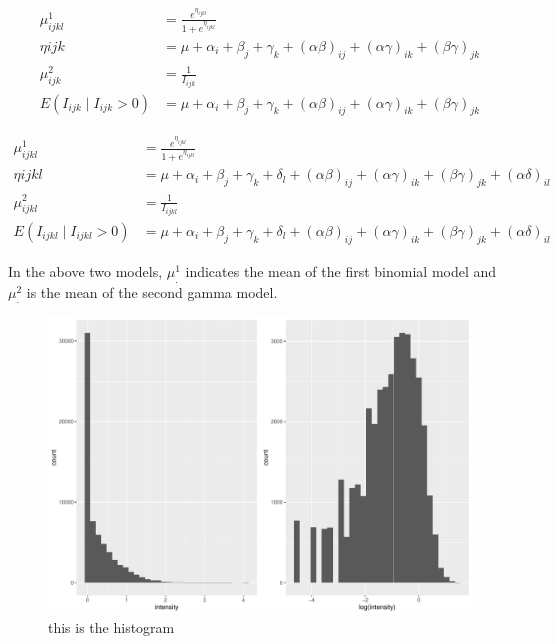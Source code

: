 \documentclass{monashthesis}
\begin{document}
\begin{align}\label{eq:two-part1}
\mu_{ijkl}^1 &= \frac{e^{\eta_{ijkl}}}{1 + e^{\eta_{ijkl}}} \\
\eta{ijk} &= \mu + \alpha_i + \beta_j +\gamma_k + (\alpha\beta)_{ij} + (\alpha\gamma)_{ik} + (\beta\gamma)_{jk} \\
\mu_{ijk}^2 &= \frac{1}{I_{ijk}} \\
E(I_{ijk} \mid I_{ijk} > 0) &= \mu + \alpha_i + \beta_j +\gamma_k + (\alpha\beta)_{ij} + (\alpha\gamma)_{ik} + (\beta\gamma)_{jk}
\end{align}

\begin{align}\label{eq:two-part2}
\mu_{ijkl}^1 &= \frac{e^{\eta_{ijkl}}}{1 + e^{\eta_{ijkl}}} \\
\eta{ijkl} &= \mu + \alpha_i + \beta_j +\gamma_k + \delta_l + (\alpha\beta)_{ij} + (\alpha\gamma)_{ik} + (\beta\gamma)_{jk} + (\alpha\delta)_{il} \\
\mu_{ijkl}^2 &= \frac{1}{I_{ijkl}} \\
E(I_{ijkl} \mid I_{ijkl} > 0) &= \mu + \alpha_i + \beta_j +\gamma_k + \delta_l + (\alpha\beta)_{ij} + (\alpha\gamma)_{ik} + (\beta\gamma)_{jk} + (\alpha\delta)_{il}
\end{align}

\noindent In the above two models, \(\mu_{.}^1\) indicates the mean of the first binomial model and \(\mu_{.}^2\) is the mean of the second gamma model.

\begin{figure}

{\centering \includegraphics[width=1\linewidth]{figures/intensity-1} 

}

\caption{this is the histogram}\label{fig:intensity}
\end{figure}
\end{document}
